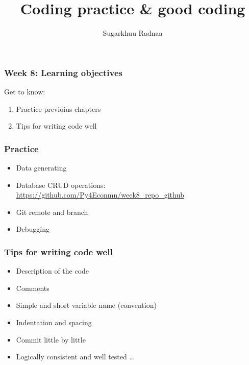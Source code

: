 \documentclass{beamer}
\title[Introduction to Python]{Coding practice \& good coding}
\author{Sugarkhuu Radnaa}
\institute[]
{
Py4Econ in Ulaanbaatar \\ 
\medskip
\textit{py4econ@gmail.com} 
}
\date{}  %
\begin{document}
\begin{frame}
\titlepage %
\end{frame}

\begin{frame}
    \frametitle{Week 8: Learning objectives}
    Get to know: 
    \begin{enumerate}
            \item Practice previoius chapters
            \item Tips for writing code well  
    \end{enumerate}
\end{frame}


\begin{frame}
    \frametitle{Practice}
    \begin{itemize}
        \item Data generating
        \item Database CRUD operations: \url{https://github.com/Py4Econmn/week8_repo_github}
        \item Git remote and branch
        \item Debugging
    \end{itemize}
\end{frame}

\begin{frame}
    \frametitle{Tips for writing code well}
    \begin{itemize}
        \item Description of the code
        \item Comments
        \item Simple and short variable name (convention)
        \item Indentation and spacing
        \item Commit little by little
        \item Logically consistent and well tested … 

    \end{itemize}
\end{frame}



\end{document}
